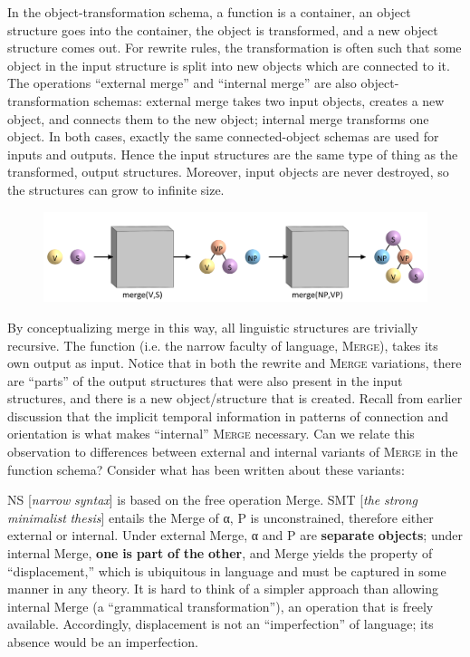   In the object-transformation schema, a function is a container, an object structure goes into the container, the object is transformed, and a new object structure comes out. For rewrite rules, the transformation is often such that some object in the input structure is split into new objects which are connected to it. The operations “external merge” and “internal merge” are also object-transformation schemas: external merge takes two input objects, creates a new object, and connects them to the new object; internal merge transforms one object. In both cases, exactly the same connected-object schemas are used for inputs and outputs. Hence the input structures are the same type of thing as the transformed, output structures. Moreover, input objects are never destroyed, so the structures can grow to infinite size.

  
\begin{figure}
\includegraphics[width=\textwidth]{figures/Tilsen-img108.png}
\caption{\missingcaption}
\label{fig:}
\end{figure}
 

  By conceptualizing merge in this way, all linguistic structures are trivially recursive. The function (i.e. the narrow faculty of language, \textsc{Merge}), takes its own output as input. Notice that in both the rewrite and \textsc{Merge} variations, there are “parts” of the output structures that were also present in the input structures, and there is a new object/structure that is created. Recall from earlier discussion that the implicit temporal information in patterns of connection and orientation is what makes “internal” \textsc{Merge} necessary. Can we relate this observation to differences between external and internal variants of \textsc{Merge} in the function schema? Consider what has been written about these variants:

NS [\textit{narrow} \textit{syntax}] is based on the free operation Merge. SMT [\textit{the} \textit{strong} \textit{minimalist} \textit{thesis}] entails the Merge of α, P is unconstrained, therefore either external or internal. Under external Merge, α and P are \textbf{separate} \textbf{objects}; under internal Merge, \textbf{one} \textbf{is} \textbf{part} \textbf{of} \textbf{the} \textbf{other}, and Merge yields the property of “displacement,” which is ubiquitous in language and must be captured in some manner in any theory. It is hard to think of a simpler approach than allowing internal Merge (a “grammatical transformation”), an operation that is freely available. Accordingly, displacement is not an “imperfection” of language; its absence would be an imperfection. \citep{Chomsky2001b}

